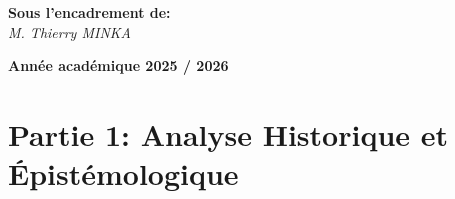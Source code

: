 \documentclass[memoire, 12pt]{report}
\begin{document}
\begin{titlepage}
\begin{center}
\begin{tabular}{c}
        \end{tabular}
    \end{center}
    
    \begin{center}
    \hspace{0.02cm} \textbf{Sous l'encadrement de:}\\
    \hspace{0.02cm} \textsl{M. Thierry MINKA}
    \end{center}
    
     
    \vspace{2cm}
    \begin{center}
        \textbf{Année académique 2025 / 2026}
    \end{center}
        
    \vspace{-1.4cm}
    
        
    \vfill%
    
\end{titlepage}
\tableofcontents
\newpage

\section*{Partie 1: Analyse Historique et Épistémologique}
\end{document}
